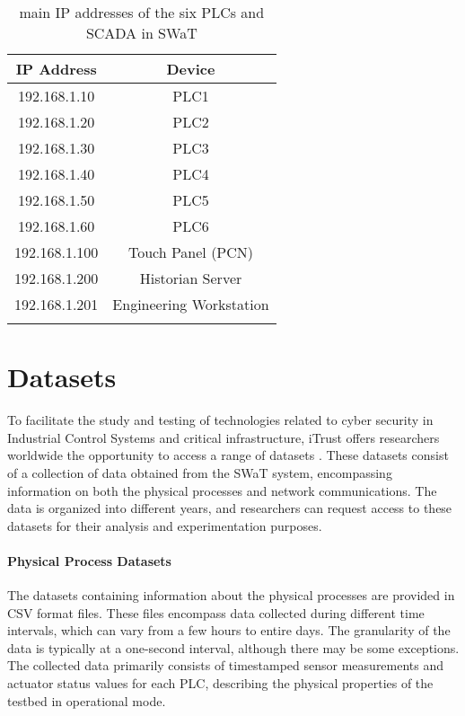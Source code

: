 \begin{longtable}[c]{| c | c |}
	\hline
	\textbf{IP Address} & \textbf{Device} \\ [0.5ex] 
	\hline
	192.168.1.10 & PLC1 \\
	\hline 
	192.168.1.20 & PLC2 \\
	\hline
	192.168.1.30 & PLC3 \\
	\hline
	192.168.1.40 & PLC4 \\
	\hline
	192.168.1.50 & PLC5 \\
	\hline
	192.168.1.60 & PLC6 \\
	\hline
	192.168.1.100 & {Touch Panel (PCN)} \\
	\hline
	192.168.1.200 & Historian Server \\
	\hline
	192.168.1.201 & Engineering Workstation \\
	\hline
	
	\caption{main IP addresses of the six PLCs and SCADA in SWaT}
	\label{table:5_swat_ip_addresses}
\end{longtable}

\section{Datasets}
\label{sec:5_swat_datasets}

To facilitate the study and testing of technologies related to cyber security in Industrial Control Systems and critical infrastructure, iTrust offers researchers worldwide the opportunity to access a range of datasets \cite{swat_datasets}. These datasets consist of a collection of data obtained from the SWaT system, encompassing information on both the physical processes and network communications. The data is organized into different years, and researchers can request access to these datasets for their analysis and experimentation purposes.

\bigskip
\paragraph{Physical Process Datasets}
The datasets containing information about the physical processes are provided in CSV format files. These files encompass data collected during different time intervals, which can vary from a few hours to entire days. The granularity of the data is typically at a one-second interval, although there may be some exceptions. The collected data primarily consists of timestamped sensor measurements and actuator status values for each PLC, describing the physical properties of the testbed in operational mode.

